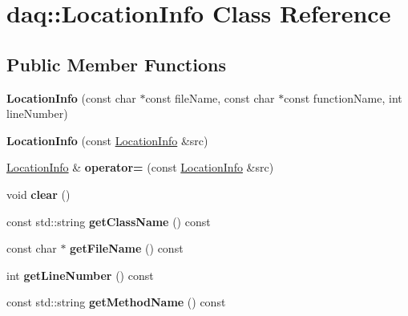 \hypertarget{classdaq_1_1LocationInfo}{}\section{daq\+:\+:Location\+Info Class Reference}
\label{classdaq_1_1LocationInfo}
\subsection*{Public Member Functions}
\begin{DoxyCompactItemize}
\item 
\mbox{\label{classdaq_1_1LocationInfo_a478eb221c1d8c79950b071dcce7fa37b}} 
{\bfseries Location\+Info} (const char $\ast$const file\+Name, const char $\ast$const function\+Name, int line\+Number)
\item 
\mbox{\label{classdaq_1_1LocationInfo_a304d89149f63986833e9a349540324d5}} 
{\bfseries Location\+Info} (const \hyperlink{classdaq_1_1LocationInfo}{Location\+Info} \&src)
\item 
\mbox{\label{classdaq_1_1LocationInfo_ada51118aec2a595cb2524d4f01c36862}} 
\hyperlink{classdaq_1_1LocationInfo}{Location\+Info} \& {\bfseries operator=} (const \hyperlink{classdaq_1_1LocationInfo}{Location\+Info} \&src)
\item 
\mbox{\label{classdaq_1_1LocationInfo_ac48bbbc323b7e0ba45ba68db011fe04b}} 
void {\bfseries clear} ()
\item 
\mbox{\label{classdaq_1_1LocationInfo_a5029a369a96fea28fd4f2d4e44ca5e61}} 
const std\+::string {\bfseries get\+Class\+Name} () const
\item 
\mbox{\label{classdaq_1_1LocationInfo_a0fcf6f200652b49362632b670033cfc7}} 
const char $\ast$ {\bfseries get\+File\+Name} () const
\item 
\mbox{\label{classdaq_1_1LocationInfo_a77255172ed0c04dd3a15fc48205009d0}} 
int {\bfseries get\+Line\+Number} () const
\item 
\mbox{\label{classdaq_1_1LocationInfo_a5f253a2b90744b08d76199799771fb24}} 
const std\+::string {\bfseries get\+Method\+Name} () const
\end{DoxyCompactItemize}
